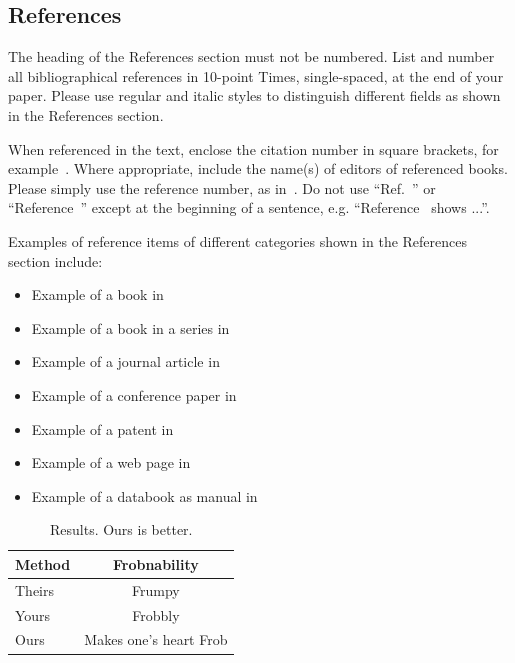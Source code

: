 {%
\subsection{References}

The heading of the References section must not be numbered. List and number all bibliographical references in 10-point Times, single-spaced, at the end of your paper. Please use regular and italic styles to distinguish different fields as shown in the References section. 

When referenced in the text, enclose the citation number in square brackets, for example~\cite{Alpher04}.  Where appropriate, include the name(s) of editors of referenced books. Please simply use the reference number, as in~\cite{Alpher04}.  Do not use ``Ref.~\cite{Alpher04}'' or ``Reference~\cite{Alpher04}'' except at the beginning of a sentence, e.g.  ``Reference~\cite{Alpher04} shows ...''. 

Examples of reference items of different categories shown in the References section include:
\begin{itemize}
\item Example of a book in~\cite{Arnold1989}
\item Example of a book in a series in~\cite{Santal'o1976}
\item Example of a journal article in~\cite{Alpher02}
\item Example of a conference paper in~\cite{Pham2011}
\item Example of a patent in~\cite{Pham2013}
\item Example of a web page in~\cite{Toshiba2011}
\item Example of a databook as manual in~\cite{Motorola1996}
\end{itemize}

\begin{table}
\begin{center}
\begin{tabular}{|l|c|}
\hline
Method & Frobnability \\
\hline\hline
Theirs & Frumpy \\
Yours & Frobbly \\
Ours & Makes one's heart Frob\\
\hline
\end{tabular}
\end{center}
\caption{\small Results.   Ours is better.}
\end{table}

}
